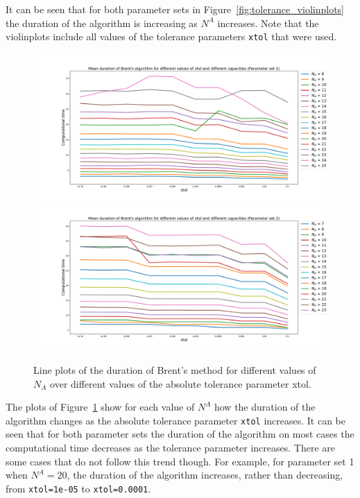 It can be seen that for both parameter sets in
Figure~\ref{fig:tolerance_violinplots} the duration of the algorithm is
increasing as \(N^A\) increases.
Note that the violinplots include all values of the tolerance parameters
\lstinline[style=pystyle]{xtol} that were used.

\begin{figure}[H]
    \centering
    \includegraphics[width=\textwidth]{chapters/04_game_theoretic_model/img/brents_method/tolerance/tolerance_lineplots_1.pdf}
    \includegraphics[width=\textwidth]{chapters/04_game_theoretic_model/img/brents_method/tolerance/tolerance_lineplots_2.pdf}
    \caption{
        Line plots of the duration of Brent's method for different values of
        \(N_A\) over different values of the absolute tolerance parameter xtol.
    }
    \label{fig:tolerance_lineplots}
\end{figure}

The plots of Figure~\ref{fig:tolerance_lineplots} show for each value of \(N^A\)
how the duration of the algorithm changes as the absolute tolerance parameter
\lstinline[style=pystyle]{xtol} increases.
It can be seen that for both parameter sets the duration of the algorithm
on most cases the computational time decreases as the tolerance parameter
increases.
There are some cases that do not follow this trend though.
For example, for parameter set 1 when \(N^A=20\), the duration of the algorithm
increases, rather than decreasing, from \lstinline[style=pystyle]{xtol=1e-05}
to \lstinline[style=pystyle]{xtol=0.0001}.



